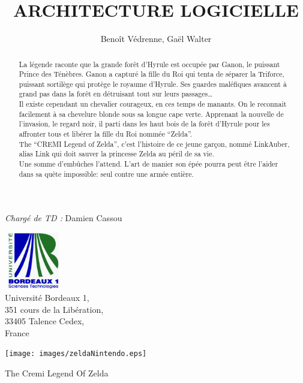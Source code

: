 \documentclass[a4paper,11pt]{article}
\title{\large{\bfseries{ARCHITECTURE LOGICIELLE}}}
\author{Benoît Védrenne, Gaël Walter}
\begin{document}
\maketitle

\begin{center}
\emph{Chargé de TD :} Damien Cassou\end{center}

\vspace{0.5cm}

\begin{center}
\includegraphics[width=2.5cm,height=2.5cm]{images/bdx1.eps}\\
\large{Université Bordeaux 1,\\
351 cours de la Libération,\\
33405 Talence Cedex,\\
France}
\end{center} 

\vspace{0cm}

\begin{center}
 \texttt{[image: images/zeldaNintendo.eps]}
\end{center}

\begin{center}
 \large{The Cremi Legend Of Zelda}
\end{center}

\begin{abstract}
La légende raconte que la grande forêt d'Hyrule est occupée par Ganon, le
puissant Prince des Ténèbres. Ganon a capturé la fille du Roi qui tenta de séparer la
Triforce, puissant sortilège qui protège le royaume d'Hyrule. Ses guardes
maléfiques avancent à grand pas dans la forêt en détruisant tout sur leurs
passages\ldots \\
Il existe cependant un chevalier courageux, en ces temps de manants. 
On le reconnait facilement à sa chevelure blonde sous sa longue cape
verte. Apprenant la nouvelle de l'invasion, le regard noir,
il parti dans les haut bois de la forêt d'Hyrule pour les affronter tous et
libérer la fille du Roi nommée ``Zelda''.\\

The ``CREMI Legend of Zelda'', c'est l'histoire de ce jeune garçon, nommé
LinkAuber, alias Link qui doit sauver la princesse Zelda au péril de sa vie. \\
Une somme d'embûches l'attend. L'art de manier son épée pourra peut être
l'aider dans sa quête impossible: seul contre une armée entière.
\end{abstract}
\end{document}
